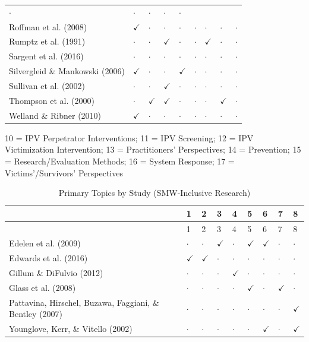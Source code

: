 \documentclass[11pt,]{tufte-book}
\begin{document}
\begin{no-prefix-table-caption}
\begin{longtable}[]{@{}lllllllll@{}}
\(\cdot\) & \(\cdot\) & \(\cdot\) & \(\cdot\) & \(\cdot\)\tabularnewline
Roffman et al. (2008) & \(\checkmark\) & \(\cdot\) & \(\cdot\) &
\(\cdot\) & \(\cdot\) & \(\cdot\) & \(\cdot\) & \(\cdot\)\tabularnewline
Rumptz et al. (1991) & \(\cdot\) & \(\cdot\) & \(\checkmark\) &
\(\cdot\) & \(\cdot\) & \(\checkmark\) & \(\cdot\) &
\(\cdot\)\tabularnewline
Sargent et al. (2016) & \(\cdot\) & \(\cdot\) & \(\cdot\) & \(\cdot\) &
\(\cdot\) & \(\cdot\) & \(\cdot\) & \(\cdot\)\tabularnewline
Silvergleid \& Mankowski (2006) & \(\checkmark\) & \(\cdot\) & \(\cdot\)
& \(\checkmark\) & \(\cdot\) & \(\cdot\) & \(\cdot\) &
\(\cdot\)\tabularnewline
Sullivan et al. (2002) & \(\cdot\) & \(\cdot\) & \(\checkmark\) &
\(\cdot\) & \(\cdot\) & \(\cdot\) & \(\cdot\) & \(\cdot\)\tabularnewline
Thompson et al. (2000) & \(\cdot\) & \(\checkmark\) & \(\checkmark\) &
\(\cdot\) & \(\cdot\) & \(\cdot\) & \(\checkmark\) &
\(\cdot\)\tabularnewline
Welland \& Ribner (2010) & \(\checkmark\) & \(\cdot\) & \(\cdot\) &
\(\cdot\) & \(\cdot\) & \(\cdot\) & \(\cdot\) & \(\cdot\)\tabularnewline
\bottomrule
\end{longtable}

\end{no-prefix-table-caption}

10 = IPV Perpetrator Interventions; 11 = IPV Screening; 12 = IPV
Victimization Intervention; 13 = Practitioners' Perspectives; 14 =
Prevention; 15 = Research/Evaluation Methods; 16 = System Response; 17 =
Victims'/Survivors' Perspectives

\newpage

\begin{longtable}[]{@{}lllllllll@{}}
\caption{Primary Topics by Study (SMW-Inclusive Research)
\label{tbl:ks4tp}}\tabularnewline
\toprule
& 1 & 2 & 3 & 4 & 5 & 6 & 7 & 8\tabularnewline
\midrule
\endfirsthead
\toprule
& 1 & 2 & 3 & 4 & 5 & 6 & 7 & 8\tabularnewline
\midrule
\endhead
Edelen et al. (2009) & \(\cdot\) & \(\cdot\) & \(\checkmark\) &
\(\cdot\) & \(\checkmark\) & \(\checkmark\) & \(\cdot\) &
\(\cdot\)\tabularnewline
Edwards et al. (2016) & \(\checkmark\) & \(\checkmark\) & \(\cdot\) &
\(\cdot\) & \(\cdot\) & \(\cdot\) & \(\cdot\) & \(\cdot\)\tabularnewline
Gillum \& DiFulvio (2012) & \(\cdot\) & \(\cdot\) & \(\cdot\) &
\(\checkmark\) & \(\cdot\) & \(\cdot\) & \(\cdot\) &
\(\cdot\)\tabularnewline
Glass et al. (2008) & \(\cdot\) & \(\cdot\) & \(\cdot\) & \(\cdot\) &
\(\checkmark\) & \(\cdot\) & \(\checkmark\) & \(\cdot\)\tabularnewline
Pattavina, Hirschel, Buzawa, Faggiani, \& Bentley (2007) & \(\cdot\) &
\(\cdot\) & \(\cdot\) & \(\cdot\) & \(\cdot\) & \(\cdot\) & \(\cdot\) &
\(\checkmark\)\tabularnewline
Younglove, Kerr, \& Vitello (2002) & \(\cdot\) & \(\cdot\) & \(\cdot\) &
\(\cdot\) & \(\cdot\) & \(\checkmark\) & \(\cdot\) &
\(\checkmark\)\tabularnewline
\bottomrule
\end{longtable}
\end{document}
